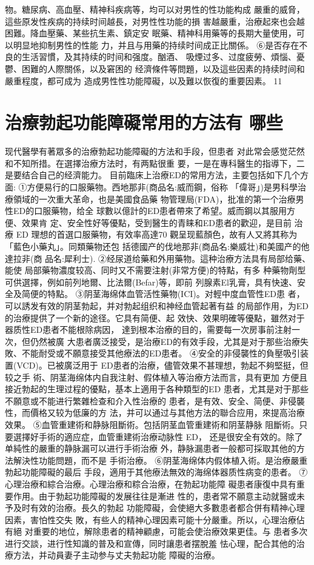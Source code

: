 \documentclass[12pt,UTF8]{ctexbook}
\begin{document}
物。糖尿病、高血壓、精神科疾病等，均可以对男性的性功能构成
嚴重的威脅，這些原发性疾病的持续时间越長，对男性性功能的損
害越嚴重，治療起來也会越困難。降血壓藥、某些抗生素、鎮定安
眠藥、精神科用藥等的長期大量使用，可以明显地抑制男性的性能
力，并且与用藥的持续时间成正比關係。
⑥是否存在不良的生活習慣，及其持续的时间和强度。酗酒、
吸煙过多、过度疲勞、煩惱、憂鬱、困難的人際關係，以及窘困的
经濟條件等問題，以及這些因素的持续时间和嚴重程度，都可成为
造成男性性功能障礙，以及難以恢復的重要因素。
11\section{治療勃起功能障礙常用的方法有
哪些}
现代醫學有著眾多的治療勃起功能障礙的方法和手段，但患者
对此常会感觉茫然和不知所措。在選擇治療方法时，有两點很重
要，一是在專科醫生的指導下，二是要结合自己的经濟能力。
目前臨床上治療ED的常用方法，主要包括如下几个方面:
①方便易行的口服藥物。西地那非(商品名:威而鋼，俗称
「偉哥」)是男科學治療領域的一次重大革命，也是美國食品藥
物管理局(FDA)，批准的第一个治療男性ED的口服藥物，给全
球數以億計的ED患者帶來了希望。威而鋼以其服用方便、效果肯
定、安全性好等優點，受到醫生的青睐和ED患者的歡迎，是目前
治療 ED 理想的首選口服藥物，有效率高達70%
觀呈现藍顏色，故有人又將其称为「藍色小藥丸」。同類藥物还包
括德國产的伐地那非(商品名:樂威壮)和美國产的他達拉非(商
品名:犀利士).
②经尿道给藥和外用藥物。這种治療方法具有局部给藥、能使
局部藥物濃度较高、同时又不需要注射(非常方便)的特點，有多
种藥物劑型可供選擇，例如前列地爾、比法爾(Befar)等，即前
列腺素El乳膏，具有快速、安全及简便的特點。
③阴茎海绵体血管活性藥物(ICI)。对輕中度血管性ED患
者，可以誘发有效的阴茎勃起，并对勃起组织和神经血管起著有益
的局部作用，为ED的治療提供了一个新的途径。它具有简便、起
效快、效果明確等優點，雖然对于器质性ED患者不能根除病因，
達到根本治療的目的，需要每一次房事前注射一次，但仍然被廣
大患者廣泛接受，是治療ED的有效手段，尤其是对于那些治療失
敗、不能耐受或不願意接受其他療法的ED患者。
④安全的非侵襲性的負壓吸引装置(VCD)。已被廣泛用于
ED患者的治療，儘管效果不甚理想，勃起不夠堅挺，但较之手
術、阴茎海绵体内自我注射、假体植入等治療方法而言，具有更加
方便且接近勃起的生理过程的優點，基本上適用于各种類型的ED
患者，尤其是对于那些不願意或不能进行繁雜检查和介入性治療的
患者，是有效、安全、简便、非侵襲性，而價格又较为低廉的方
法，并可以通过与其他方法的聯合应用，來提高治療效果。
⑤血管重建術和静脉阻斷術。包括阴茎血管重建術和阴茎静脉
阻斷術。只要選擇好手術的適应症，血管重建術治療动脉性 ED，
还是很安全有效的。除了单純性的嚴重的静脉漏可以进行手術治療
外，静脉漏患者一般都可採取其他的方法解決性功能問題，而不是
手術治療。
⑥阴茎海绵体内假体植入術。是治療嚴重勃起功能障礙的最后
手段，適用于其他療法無效的海绵体器质性病变的患者。
⑦心理治療和綜合治療。心理治療和粽合治療，在勃起功能障
礙患者康復中具有重要作用。由于勃起功能障礙的发展往往是漸进
性的，患者常不願意主动就醫或未予及时有效的治療。長久的勃起
功能障礙，会使絕大多數患者都合併有精神心理因素，害怕性交失
敗，有些人的精神心理因素可能十分嚴重。所以，心理治療佔有絕
对重要的地位，解除患者的精神顧慮，可能会使治療效果更佳。与
患者多次进行交談，进行性知識的普及和宣傳，同时讓患者摆脫羞
怯心理，配合其他的治療方法，并动員妻子主动参与丈夫勃起功能
障礙的治療。
\end{document}
